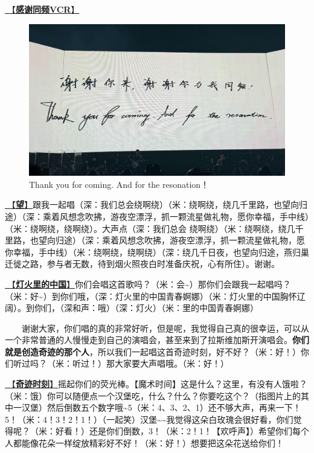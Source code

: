 \documentclass[]{ctexbook}
\begin{document}
\hyperref[thank-you-vcr]{🎥【\textbf{感谢同频VCR}】}

\begin{figure}

{\centering \includegraphics[width=400pt]{img/lasvegas20250228/thankyou} 

}

\caption{Thank you for coming. And for the resonation！}\label{fig:unnamed-chunk-174}
\end{figure}

\hyperref[hope]{🎵【\textbf{望}】}跟我一起唱（深：我们总会绕啊绕）（米：绕啊绕，绕几千里路，也望向归途）（深：乘着风想念吹拂，游夜空漂浮，抓一颗流星做礼物，愿你幸福，手中线）（米：绕啊绕，绕啊绕）。大声点（深：我们总会 绕啊绕）（米：绕啊绕，绕几千里路，也望向归途）（深：乘着风想念吹拂，游夜空漂浮，抓一颗流星做礼物，愿你幸福，手中线）（米：绕啊绕，绕啊绕）（深：绕几千日夜，也望向归途，燕归巢迁徙之路，参与者无数，待到烟火照夜白时准备庆祝，心有所住）。谢谢。

\hyperref[China-in-the-light]{🎵【\textbf{灯火里的中国}】}你们会唱这首歌吗？（米：会\textasciitilde）那你们会跟我一起唱吗？（米：好\textasciitilde）到你们哦，（深：灯火里的中国青春婀娜）（米：灯火里的中国胸怀辽阔）。到你们，（深和声：哦）（深：灯火）（米：里的中国青春婀娜）

  谢谢大家，你们唱的真的非常好听，但是呢，我觉得自己真的很幸运，可以从一个非常普通的人慢慢走到自己的演唱会，甚至来到了拉斯维加斯开演唱会。\textbf{你们就是创造奇迹的那个人}，所以我们一起唱这首奇迹时刻，好不好？（米：好！）你们听过吗？（米：听过！）那大家要大声唱哦。（米：好！）

\hyperref[magic-moment]{🎵【\textbf{奇迹时刻}】}摇起你们的荧光棒。【魔术时间】这是什么？这里，有没有人饿啦？（米：饿）你可以随便点一个汉堡吃，什么？什么？你要吃这个？（指图片上的其中一汉堡）然后倒数五个数字哦\textasciitilde5（米：4、3、2、1）还不够大声，再来一下！5！（米：4！3！2！1！）（一起笑）汉堡\textasciitilde\textasciitilde 我觉得这朵白玫瑰会很好看，你们觉得呢？（米：好看！）还是你们倒数，3！（米：2！1！【欢呼声】）希望你们每个人都能像花朵一样绽放精彩好不好！（米：好！）想要把这朵花送给你们！
\end{document}
